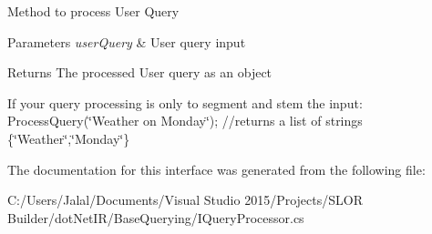 Method to process User Query 


\begin{DoxyParams}{Parameters}
{\em user\+Query} & User query input\\
\hline
\end{DoxyParams}
\begin{DoxyReturn}{Returns}
The processed User query as an object
\end{DoxyReturn}


If your query processing is only to segment and stem the input\+: Process\+Query(\char`\"{}\+Weather on Monday\char`\"{}); //returns a list of strings \{\char`\"{}\+Weather\char`\"{},\char`\"{}\+Monday\char`\"{}\} 

The documentation for this interface was generated from the following file\+:\begin{DoxyCompactItemize}
\item 
C\+:/\+Users/\+Jalal/\+Documents/\+Visual Studio 2015/\+Projects/\+S\+L\+O\+R Builder/dot\+Net\+I\+R/\+Base\+Querying/I\+Query\+Processor.\+cs\end{DoxyCompactItemize}
